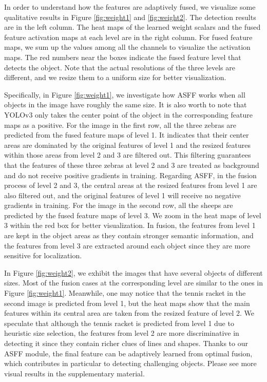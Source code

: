 \documentclass[10pt,twocolumn,letterpaper]{article}
\begin{document}
In order to understand how the features are adaptively fused, we visualize some qualitative results in Figure \ref{fig:weight1} and \ref{fig:weight2}. The detection results are in the left column. The heat maps of the learned weight scalars and the fused feature activation maps at each level are in the right column. For fused feature maps, we sum up the values among all the channels to visualize the activation maps. The red numbers near the boxes indicate the fused feature level that detects the object. Note that the actual resolutions of the three levels are different, and we resize them to a uniform size for better visualization.

Specifically, in Figure \ref{fig:weight1}, we investigate how ASFF works when all objects in the image have roughly the same size. It is also worth to note that YOLOv3 only takes the center point of the object in the corresponding feature maps as a positive. For the image in the first row, all the three zebras are predicted from the fused feature maps of level 1. It indicates that their center areas are dominated by the original features of level 1 and the resized features within those areas from level 2 and 3 are filtered out. This filtering guarantees that the features of these three zebras at level 2 and 3 are treated as background and do not receive positive gradients in training. Regarding ASFF, in the fusion process of level 2 and 3, the central areas at the resized features from level 1 are also filtered out, and the original features of level 1 will receive no negative gradients in training. For the image in the second row, all the sheeps are predicted by the fused feature maps of level 3. We zoom in the heat maps of level 3 within the red box for better visualization. In fusion, the features from level 1 are kept in the object areas as they contain stronger semantic information, and the features from level 3 are extracted around each object since they are more sensitive for localization.

In Figure \ref{fig:weight2}, we exhibit the images that have several objects of different sizes. Most of the fusion cases at the corresponding level are similar to the ones in Figure \ref{fig:weight1}. Meanwhile, one may notice that the tennis racket in the second image is predicted from level 1, but the heat maps show that the main features within its central area are taken from the resized feature of level 2. We speculate that although the tennis racket is predicted from level 1 due to heuristic size selection, the features from level 2 are more discriminative in detecting it since they contain richer clues of lines and shapes. Thanks to our ASFF module, the final feature can be adaptively learned from optimal fusion, which contributes in particular to detecting challenging objects. Please see more visual results in the supplementary material.
\end{document}
